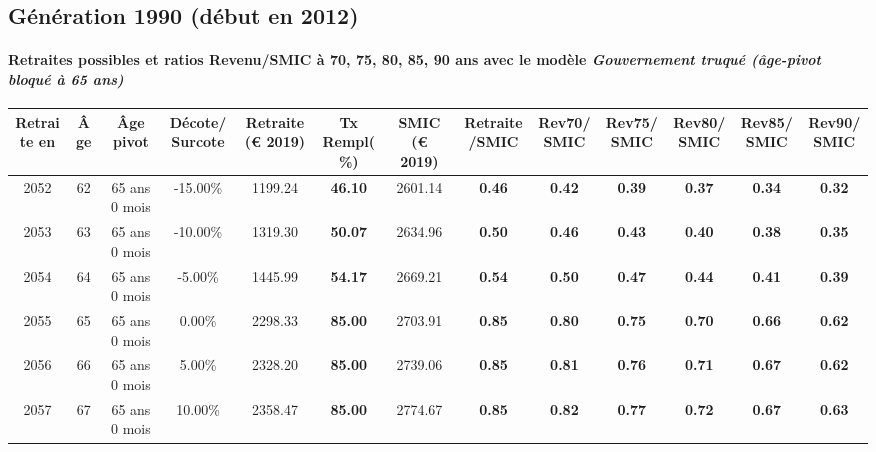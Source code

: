 \newpage 
 
\subsection{Génération 1990 (début en 2012)} 

\paragraph{Retraites possibles et ratios Revenu/SMIC à 70, 75, 80, 85, 90 ans avec le modèle \emph{Gouvernement truqué (âge-pivot bloqué à 65 ans)}}  
 
{ \scriptsize \begin{center} 
\begin{tabular}[htb]{|c|c||c|c||c|c||c||c|c|c|c|c|c|} 
\hline 
 Retraite en &  Âge &  Âge pivot &  Décote/Surcote &  Retraite (\euro{} 2019) &  Tx Rempl(\%) &  SMIC (\euro{} 2019) &  Retraite/SMIC &  Rev70/SMIC &  Rev75/SMIC &  Rev80/SMIC &  Rev85/SMIC &  Rev90/SMIC \\ 
\hline \hline 
 2052 &  62 &  65 ans 0 mois &  -15.00\% &  1199.24 &  {\bf 46.10} &  2601.14 &  {\bf {\color{red} 0.46}} &  {\bf {\color{red} 0.42}} &  {\bf {\color{red} 0.39}} &  {\bf {\color{red} 0.37}} &  {\bf {\color{red} 0.34}} &  {\bf {\color{red} 0.32}} \\ 
\hline 
 2053 &  63 &  65 ans 0 mois &  -10.00\% &  1319.30 &  {\bf 50.07} &  2634.96 &  {\bf {\color{red} 0.50}} &  {\bf {\color{red} 0.46}} &  {\bf {\color{red} 0.43}} &  {\bf {\color{red} 0.40}} &  {\bf {\color{red} 0.38}} &  {\bf {\color{red} 0.35}} \\ 
\hline 
 2054 &  64 &  65 ans 0 mois &  -5.00\% &  1445.99 &  {\bf 54.17} &  2669.21 &  {\bf {\color{red} 0.54}} &  {\bf {\color{red} 0.50}} &  {\bf {\color{red} 0.47}} &  {\bf {\color{red} 0.44}} &  {\bf {\color{red} 0.41}} &  {\bf {\color{red} 0.39}} \\ 
\hline 
 2055 &  65 &  65 ans 0 mois &  0.00\% &  2298.33 &  {\bf 85.00} &  2703.91 &  {\bf {\color{red} 0.85}} &  {\bf {\color{red} 0.80}} &  {\bf {\color{red} 0.75}} &  {\bf {\color{red} 0.70}} &  {\bf {\color{red} 0.66}} &  {\bf {\color{red} 0.62}} \\ 
\hline 
 2056 &  66 &  65 ans 0 mois &  5.00\% &  2328.20 &  {\bf 85.00} &  2739.06 &  {\bf {\color{red} 0.85}} &  {\bf {\color{red} 0.81}} &  {\bf {\color{red} 0.76}} &  {\bf {\color{red} 0.71}} &  {\bf {\color{red} 0.67}} &  {\bf {\color{red} 0.62}} \\ 
\hline 
 2057 &  67 &  65 ans 0 mois &  10.00\% &  2358.47 &  {\bf 85.00} &  2774.67 &  {\bf {\color{red} 0.85}} &  {\bf {\color{red} 0.82}} &  {\bf {\color{red} 0.77}} &  {\bf {\color{red} 0.72}} &  {\bf {\color{red} 0.67}} &  {\bf {\color{red} 0.63}} \\ 
\hline 
\hline 
\end{tabular} 
\end{center} } 
